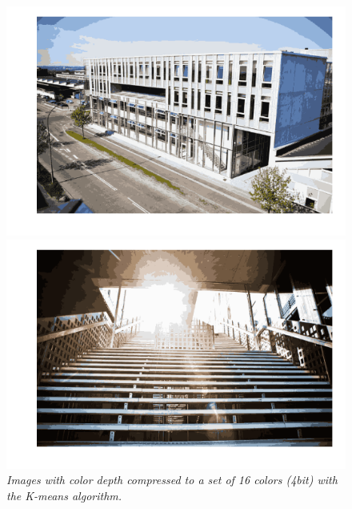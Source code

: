 \documentclass[a4paper,10pt,article,oneside,english]{memoir}
\let\oldcaption\caption
\renewcommand{\caption}[1]{\oldcaption{\emph{#1}}}
\begin{document}
\begin{figure}
	\centering
	\begin{minipage}{.49\textwidth}
		\includegraphics[width=\textwidth]{nygaard_facade_k16.png}
	\end{minipage}
	\hfill
	\begin{minipage}{.49\textwidth}
		\includegraphics[width=\textwidth]{nygaard_stairs_k16.png}
	\end{minipage}
	\caption{Images with color depth compressed to a set of 16 colors (4bit) with the K-means algorithm.}
	\label{fig:comp16}
\end{figure}
\end{document}
